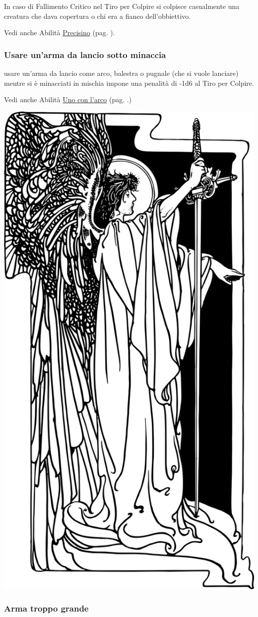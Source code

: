 \begin{multicols}{2}
In caso di Fallimento Critico nel Tiro per Colpire si colpisce casualmente una creatura che dava copertura o chi era a fianco dell'obbiettivo.

Vedi anche Abilità \hyperlink{Precisino}{Precisino} (pag. \pageref{Precisino}).

\subsubsection{Usare un'arma da lancio sotto minaccia} \label{usarearmalanciosottominaccia}

usare un'arma da lancio come arco, balestra o pugnale (che si vuole lanciare) mentre si è minacciati in mischia impone una penalità di -1d6 al Tiro per Colpire.

Vedi anche Abilità \hyperlink{Uno con l'arco}{Uno con l'arco} (pag. \pageref{Uno con l'arco}.)

\medskip

\begin{center}
	\includegraphics[width=0.55\linewidth]{immagini/angelospadone.png}
\end{center}

\subsubsection{Arma troppo grande} \label{armatroppogrande}


\end{multicols}
